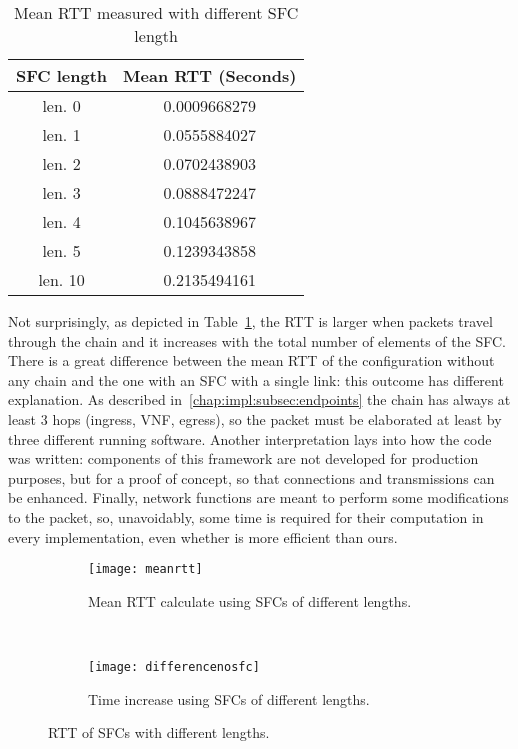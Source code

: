 \begin{table}[H]
\centering
\begin{tabular}{@{}cc@{}}
\toprule
\textbf{SFC length} & \textbf{Mean RTT (Seconds)} \\ \midrule
len. 0              & 0.0009668279      \\
len. 1              & 0.0555884027      \\
len. 2              & 0.0702438903      \\
len. 3              & 0.0888472247      \\
len. 4              & 0.1045638967      \\
len. 5              & 0.1239343858      \\
len. 10             & 0.2135494161      \\ \bottomrule
\end{tabular}
\caption{Mean RTT measured with different SFC length}
\label{chap:tests:sec:rtt:tab:meanrtt}
\end{table}

\noindent
Not surprisingly, as depicted in Table~\ref{chap:tests:sec:rtt:tab:meanrtt},
the RTT is larger when packets travel through the chain and it increases with
the total number of elements of the SFC. There is a great difference between
the mean RTT of the configuration without any chain and the one with an SFC
with a single link: this outcome has different explanation. As
described in~\ref{chap:impl:subsec:endpoints} the chain has always at
least 3 hops (ingress, VNF, egress), so the packet must be elaborated at least
by three different running software. Another interpretation lays into how the
code was written: components of this framework are not developed for production
purposes, but for a proof of concept, so that connections and transmissions can
be enhanced. Finally, network functions are meant to perform some modifications
to the packet, so, unavoidably, some time is required for their computation in
every implementation, even whether is more efficient than ours.

\begin{figure}[H]
    \begin{subfigure}[b]{0.45\textwidth}
        \texttt{[image: meanrtt]}
        \caption{Mean RTT calculate using SFCs of different lengths.}
        \label{chap:tests:sec:rtt:img:meanstt}
    \end{subfigure}
    ~
    \begin{subfigure}[b]{0.45\textwidth}
        \texttt{[image: differencenosfc]}
        \caption{Time increase using SFCs of different lengths.}
        \label{chap:tests:sec:rtt:img:differencertt}
    \end{subfigure}
    \caption{RTT of SFCs with different lengths.}
\end{figure}

